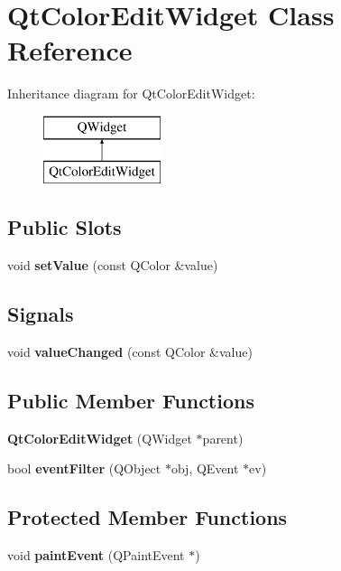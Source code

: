 \section{Qt\+Color\+Edit\+Widget Class Reference}
\label{classQtColorEditWidget}
Inheritance diagram for Qt\+Color\+Edit\+Widget\+:\begin{figure}[H]
\begin{center}
\leavevmode
\includegraphics[height=2.000000cm]{classQtColorEditWidget}
\end{center}
\end{figure}
\subsection*{Public Slots}
\begin{DoxyCompactItemize}
\item 
void {\bf set\+Value} (const Q\+Color \&value)
\end{DoxyCompactItemize}
\subsection*{Signals}
\begin{DoxyCompactItemize}
\item 
void {\bf value\+Changed} (const Q\+Color \&value)
\end{DoxyCompactItemize}
\subsection*{Public Member Functions}
\begin{DoxyCompactItemize}
\item 
{\bf Qt\+Color\+Edit\+Widget} (Q\+Widget $\ast$parent)
\item 
bool {\bf event\+Filter} (Q\+Object $\ast$obj, Q\+Event $\ast$ev)
\end{DoxyCompactItemize}
\subsection*{Protected Member Functions}
\begin{DoxyCompactItemize}
\item 
void {\bf paint\+Event} (Q\+Paint\+Event $\ast$)
\end{DoxyCompactItemize}



